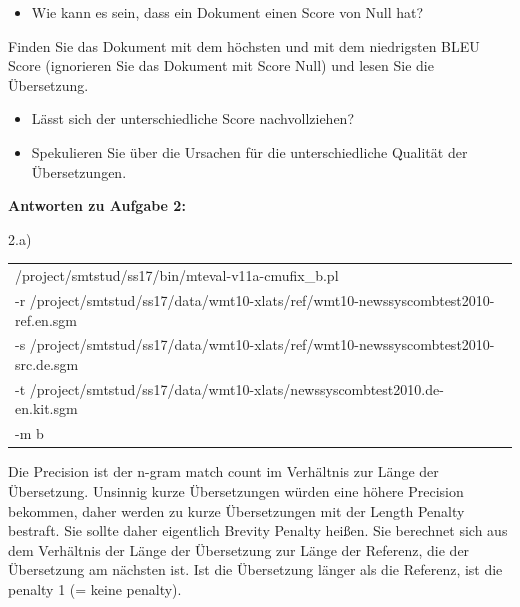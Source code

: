 \documentclass[12pt,fleqn]{article}
\begin{document}
\begin{enumerate}
\begin{enumerate}
\vspace{0.5cm} 
\begin{itemize} 
\item Wie kann es sein, dass ein Dokument einen Score von Null hat?
\end{itemize} 

\vspace{0.5cm} 
Finden Sie das Dokument mit dem höchsten und mit dem niedrigsten BLEU Score (ignorieren Sie das Dokument mit Score Null) und lesen Sie die Übersetzung.

\vspace{0.5cm} 
\begin{itemize} 
\item Lässt sich der unterschiedliche Score nachvollziehen?
\item Spekulieren Sie über die Ursachen für die unterschiedliche Qualität der Übersetzungen.
\end{itemize} 

\end{enumerate} 

\textbf{Antworten zu Aufgabe 2:} 

2.a) \\ 

\begin{table}[h] 
 \begin{center} 
\begin{tabular}{l} 
/project/smtstud/ss17/bin/mteval-v11a-cmufix\_b.pl  \\ 
-r /project/smtstud/ss17/data/wmt10-xlats/ref/wmt10-newssyscombtest2010-ref.en.sgm  \\ 
-s /project/smtstud/ss17/data/wmt10-xlats/ref/wmt10-newssyscombtest2010-src.de.sgm  \\ 
-t /project/smtstud/ss17/data/wmt10-xlats/newssyscombtest2010.de-en.kit.sgm  \\ 
-m b \\ 
\end{tabular}
 \end{center}
\end{table}



Die Precision ist der n-gram match count im Verhältnis zur Länge der Übersetzung. Unsinnig kurze Übersetzungen würden eine höhere Precision bekommen, daher werden zu kurze Übersetzungen mit der Length Penalty bestraft. Sie sollte daher eigentlich Brevity Penalty heißen. Sie berechnet sich aus dem Verhältnis der Länge der Übersetzung zur Länge der Referenz, die der Übersetzung am nächsten ist. Ist die Übersetzung länger als die Referenz, ist die penalty 1 (= keine penalty). 



\end{enumerate}
\end{document}
